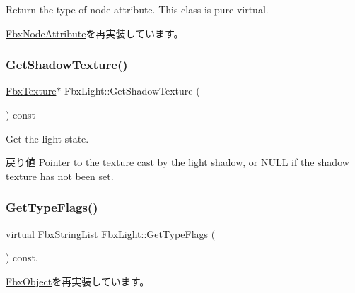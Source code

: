 Return the type of node attribute. This class is pure virtual. 

\hyperlink{class_fbx_node_attribute_a1c2116756906127145a2b8721fc26752}{Fbx\+Node\+Attribute}を再実装しています。

\mbox{\label{class_fbx_light_a853f9998aa5dce0f60752794e58b0250}} 
\subsubsection{\texorpdfstring{Get\+Shadow\+Texture()}{GetShadowTexture()}}
{\footnotesize\ttfamily \hyperlink{class_fbx_texture}{Fbx\+Texture}$\ast$ Fbx\+Light\+::\+Get\+Shadow\+Texture (\begin{DoxyParamCaption}{ }\end{DoxyParamCaption}) const}

Get the light state. \begin{DoxyReturn}{戻り値}
Pointer to the texture cast by the light shadow, or {\ttfamily N\+U\+LL} if the shadow texture has not been set. 
\end{DoxyReturn}
\mbox{\label{class_fbx_light_a962256338837265748540bd0b3d9b511}} 
\subsubsection{\texorpdfstring{Get\+Type\+Flags()}{GetTypeFlags()}}
{\footnotesize\ttfamily virtual \hyperlink{class_fbx_string_list}{Fbx\+String\+List} Fbx\+Light\+::\+Get\+Type\+Flags (\begin{DoxyParamCaption}{ }\end{DoxyParamCaption}) const\hspace{0.3cm}{\ttfamily [protected]}, {\ttfamily [virtual]}}



\hyperlink{class_fbx_object_a6d30a5d00400039a248977cf9f9255b2}{Fbx\+Object}を再実装しています。

\mbox{\label{class_fbx_light_af6ea79f113aa9ba55bcbfa98e36d9bfe}} 
